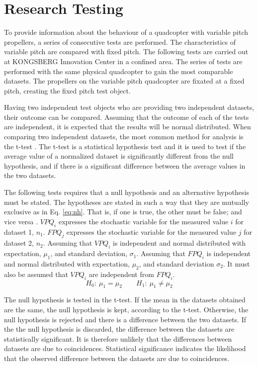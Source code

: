 \chapter{Research Testing}
To provide information about the behaviour of a quadcopter with variable pitch propellers, a series of consecutive tests are performed. The characteristics of variable pitch are compared with fixed pitch. The following tests are carried out at KONGSBERG Innovation Center in a confined area. The series of tests are performed with the same physical quadcopter to gain the most comparable datasets.  The propellers on the variable pitch quadcopter are fixated at a fixed pitch, creating the fixed pitch test object. \bigskip

Having two independent test objects who are providing two independent datasets, their outcome can be compared. Assuming that the outcome of each of the tests are independent, it is expected that the results will be normal distributed. When comparing two independent datasets, the most common method for analysis is the t-test \cite{statistikk}. The t-test is a statistical hypothesis test and it is used to test if the average value of a normalized dataset is significantly different from the null hypothesis, and if there is a significant difference between the average values in the two datasets.\bigskip

The following tests requires that a null hypothesis and an alternative hypothesis must be stated. The hypotheses are stated in such a way that they are mutually exclusive as in Eq. \ref{eq:nh}. That is, if one is true, the other must be false; and vice versa \cite{statistikk4}. $VPQ_i$ expresses the stochastic variable for the measured value $i$ for dataset 1, $n_1$. $FPQ_j$ expresses the stochastic variable for the measured value $j$ for dataset 2, $n_2$. Assuming that $VPQ_i$ is independent and normal distributed with expectation, $\mu_1$, and standard deviation, $\sigma_1$.  Assuming that $FPQ_i$ is independent and normal distributed with expectation, $\mu_2$, and standard deviation $\sigma_2$. It must also be assumed that $VPQ_i$ are independent from $FPQ_i$. 
\begin{equation}
\label{eq:nh}
H_0:\: \mu_1 = \mu_2 \quad \quad H_1:\: \mu_1 \neq \mu_2
\end{equation}

The null hypothesis is tested in the t-test. If the mean in the datasets obtained are the same, the null hypothesis is kept, according to the t-test. Otherwise, the null hypothesis is rejected and there is a difference between the two datasets. If the the null hypothesis is discarded, the difference between the datasets are statistically significant. It is therefore unlikely that the differences between datasets are due to coincidences. Statistical significance indicates the likelihood that the observed difference between the datasets are due to coincidences.
\newpage

